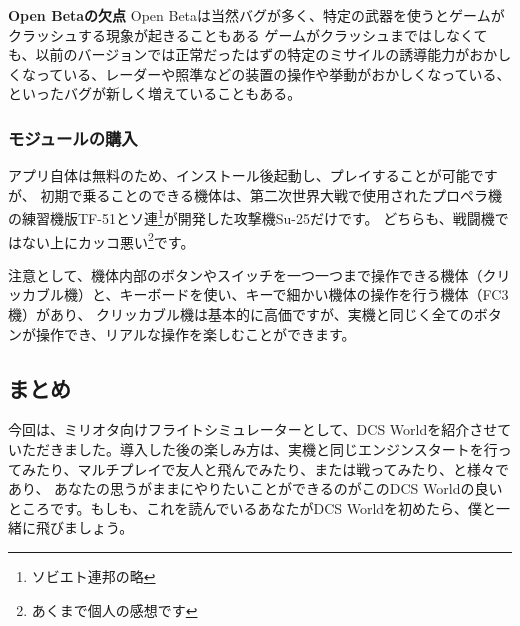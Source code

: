   \textbf{Open Betaの欠点}
Open Betaは当然バグが多く、特定の武器を使うとゲームがクラッシュする現象が起きることもある
ゲームがクラッシュまではしなくても、以前のバージョンでは正常だったはずの特定のミサイルの誘導能力がおかしくなっている、レーダーや照準などの装置の操作や挙動がおかしくなっている、といったバグが新しく増えていることもある。

\subsubsection{モジュールの購入}
アプリ自体は無料のため、インストール後起動し、プレイすることが可能ですが、
初期で乗ることのできる機体は、第二次世界大戦で使用されたプロペラ機の練習機版TF-51とソ連\footnote{ソビエト連邦の略}が開発した攻撃機Su-25だけです。
どちらも、戦闘機ではない上にカッコ悪い\footnote{あくまで個人の感想です}です。


注意として、機体内部のボタンやスイッチを一つ一つまで操作できる機体（クリッカブル機）と、キーボードを使い、キーで細かい機体の操作を行う機体（FC3機）があり、
クリッカブル機は基本的に高価ですが、実機と同じく全てのボタンが操作でき、リアルな操作を楽しむことができます。

\subsection{まとめ}
今回は、ミリオタ向けフライトシミュレーターとして、DCS Worldを紹介させていただきました。導入した後の楽しみ方は、実機と同じエンジンスタートを行ってみたり、マルチプレイで友人と飛んでみたり、または戦ってみたり、と様々であり、
あなたの思うがままにやりたいことができるのがこのDCS Worldの良いところです。もしも、これを読んでいるあなたがDCS Worldを初めたら、僕と一緒に飛びましょう。